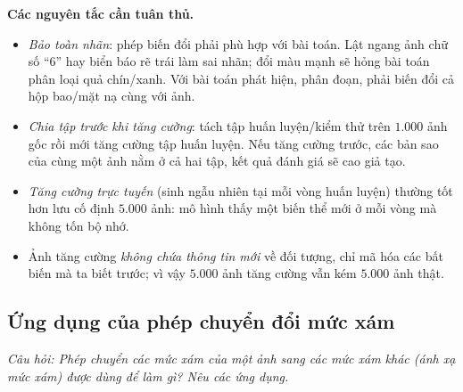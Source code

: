 \textbf{Các nguyên tắc cần tuân thủ.}
\begin{itemize}
    \item \emph{Bảo toàn nhãn}: phép biến đổi phải phù hợp với bài toán. Lật ngang ảnh chữ số ``6'' hay biển báo rẽ trái làm sai nhãn; đổi màu mạnh sẽ hỏng bài toán phân loại quả chín/xanh. Với bài toán phát hiện, phân đoạn, phải biến đổi cả hộp bao/mặt nạ cùng với ảnh.
    \item \emph{Chia tập trước khi tăng cường}: tách tập huấn luyện/kiểm thử trên $1.000$ ảnh gốc rồi mới tăng cường tập huấn luyện. Nếu tăng cường trước, các bản sao của cùng một ảnh nằm ở cả hai tập, kết quả đánh giá sẽ cao giả tạo.
    \item \emph{Tăng cường trực tuyến} (sinh ngẫu nhiên tại mỗi vòng huấn luyện) thường tốt hơn lưu cố định $5.000$ ảnh: mô hình thấy một biến thể mới ở mỗi vòng mà không tốn bộ nhớ.
    \item Ảnh tăng cường \emph{không chứa thông tin mới} về đối tượng, chỉ mã hóa các bất biến mà ta biết trước; vì vậy $5.000$ ảnh tăng cường vẫn kém $5.000$ ảnh thật.
\end{itemize}

\subsection{Ứng dụng của phép chuyển đổi mức xám}
\label{subsec:w5_applications}

\textit{Câu hỏi: Phép chuyển các mức xám của một ảnh sang các mức xám khác (ánh xạ mức xám) được dùng để làm gì? Nêu các ứng dụng.}

